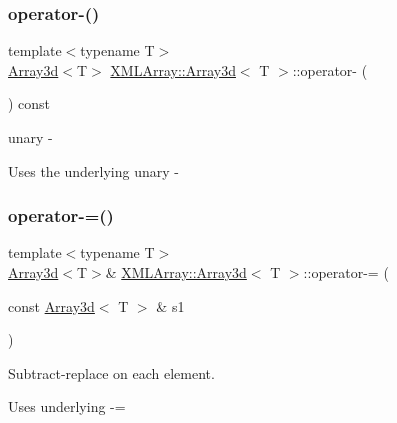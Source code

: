 \subsubsection{\texorpdfstring{operator-\/()}{operator-()}\hspace{0.1cm}{\footnotesize\ttfamily [3/3]}}
{\footnotesize\ttfamily template$<$typename T$>$ \\
\mbox{\hyperlink{classXMLArray_1_1Array3d}{Array3d}}$<$T$>$ \mbox{\hyperlink{classXMLArray_1_1Array3d}{X\+M\+L\+Array\+::\+Array3d}}$<$ T $>$\+::operator-\/ (\begin{DoxyParamCaption}{ }\end{DoxyParamCaption}) const\hspace{0.3cm}{\ttfamily [inline]}}



unary -\/ 

Uses the underlying unary -\/ \mbox{\label{classXMLArray_1_1Array3d_a9d4e2f24b2d52634a926ec4fb758828b}} 
\subsubsection{\texorpdfstring{operator-\/=()}{operator-=()}\hspace{0.1cm}{\footnotesize\ttfamily [1/3]}}
{\footnotesize\ttfamily template$<$typename T$>$ \\
\mbox{\hyperlink{classXMLArray_1_1Array3d}{Array3d}}$<$T$>$\& \mbox{\hyperlink{classXMLArray_1_1Array3d}{X\+M\+L\+Array\+::\+Array3d}}$<$ T $>$\+::operator-\/= (\begin{DoxyParamCaption}\item[{const \mbox{\hyperlink{classXMLArray_1_1Array3d}{Array3d}}$<$ T $>$ \&}]{s1 }\end{DoxyParamCaption})\hspace{0.3cm}{\ttfamily [inline]}}



Subtract-\/replace on each element. 

Uses underlying -\/= \mbox{\label{classXMLArray_1_1Array3d_a9d4e2f24b2d52634a926ec4fb758828b}} 
